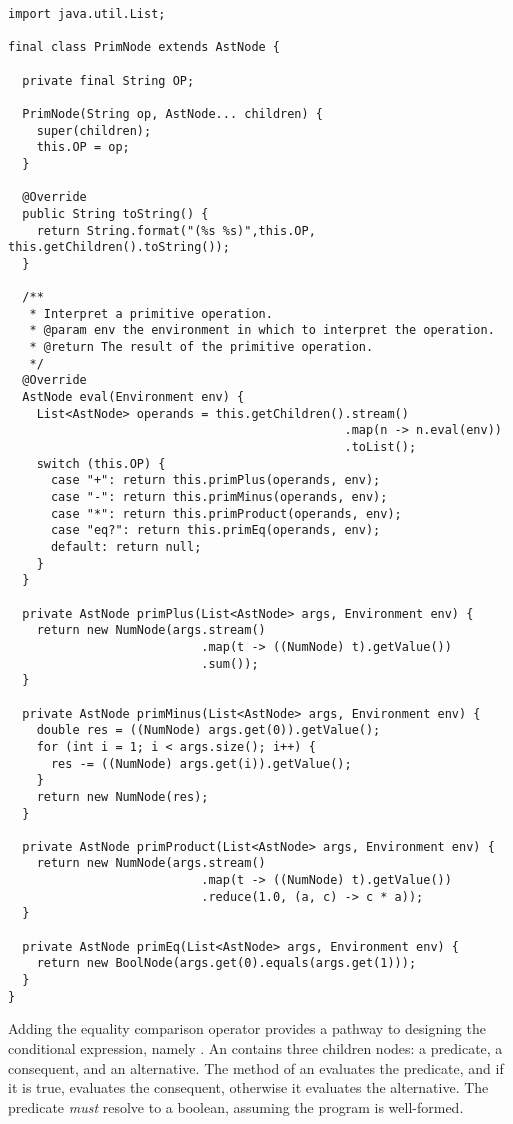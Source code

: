 \begin{lstlisting}[language=MyJava]
import java.util.List;

final class PrimNode extends AstNode {

  private final String OP;

  PrimNode(String op, AstNode... children) {
    super(children);
    this.OP = op;
  }

  @Override
  public String toString() {
    return String.format("(%s %s)",this.OP, this.getChildren().toString());
  }

  /**
   * Interpret a primitive operation.
   * @param env the environment in which to interpret the operation.
   * @return The result of the primitive operation.
   */
  @Override
  AstNode eval(Environment env) {
    List<AstNode> operands = this.getChildren().stream()
                                               .map(n -> n.eval(env))
                                               .toList();
    switch (this.OP) {
      case "+": return this.primPlus(operands, env);
      case "-": return this.primMinus(operands, env);
      case "*": return this.primProduct(operands, env);
      case "eq?": return this.primEq(operands, env);
      default: return null;
    }
  }

  private AstNode primPlus(List<AstNode> args, Environment env) {
    return new NumNode(args.stream()
                           .map(t -> ((NumNode) t).getValue())
                           .sum());
  }

  private AstNode primMinus(List<AstNode> args, Environment env) {
    double res = ((NumNode) args.get(0)).getValue();
    for (int i = 1; i < args.size(); i++) {
      res -= ((NumNode) args.get(i)).getValue();
    }
    return new NumNode(res);
  }

  private AstNode primProduct(List<AstNode> args, Environment env) {
    return new NumNode(args.stream()
                           .map(t -> ((NumNode) t).getValue())
                           .reduce(1.0, (a, c) -> c * a));
  }

  private AstNode primEq(List<AstNode> args, Environment env) {
    return new BoolNode(args.get(0).equals(args.get(1)));
  }
}
\end{lstlisting}

Adding the equality comparison operator provides a pathway to designing the conditional expression, namely . 
An  contains three children nodes: a predicate, a consequent, and an alternative. 
The  method of an  evaluates the predicate, and if it is true, evaluates the consequent, otherwise it evaluates the alternative. 
The predicate \emph{must} resolve to a boolean, assuming the program is well-formed. 

